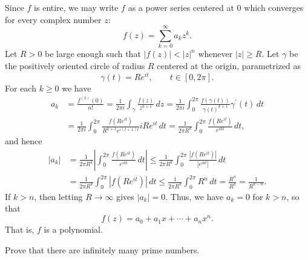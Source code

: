 \documentclass{homework}
\begin{document}
\begin{solution}
Since $f$ is entire, we may write $f$ as a power series centered at $0$ which
converges for every complex number $z$:
\begin{equation*}
f(z) = \sum_{k=0}^\infty a_k z^k.
\end{equation*}
Let $R > 0$ be large enough such that $|f(z)| < |z|^n$ whenever $|z| \geq R$.
Let $\gamma$ be the positively oriented circle of radius $R$ centered at the
origin, parametrized as
\begin{equation*}
\gamma(t) = R e^{i t},
\qquad
t \in [0,2\pi].
\end{equation*}
For each $k \geq 0$ we have
\begin{align*}
a_k
&= \frac{f^{(k)}(0)}{n!}
= \frac{1}{2 \pi i} \int_\gamma \frac{f(z)}{z^{k+1}} \, dz
= \frac{1}{2 \pi i} \int_0^{2\pi} \frac{f(\gamma(t))}{\gamma(t)^{k+1}} \gamma^\prime(t) \, dt
\\&= \frac{1}{2 \pi i} \int_0^{2\pi} \frac{f(R e^{i t})}{R^{k+1} e^{i(t+1) t}} i R e^{i t} \, dt
= \frac{1}{2 \pi R^k} \int_0^{2\pi} \frac{f(R e^{i t})}{e^{i k t}} \, dt,
\end{align*}
and hence
\begin{align*}
|a_k|
&= \frac{1}{2 \pi R^k} \left|\int_0^{2\pi} \frac{f(R e^{i t})}{e^{i k t}} \, dt\right|
\leq \frac{1}{2 \pi R^k} \int_0^{2\pi} \frac{|f(R e^{i t})|}{|e^{i k t}|} \, dt
\\&= \frac{1}{2 \pi R^k} \int_0^{2\pi} |f(R e^{i t})| \, dt
\leq \frac{1}{2 \pi R^k} \int_0^{2\pi} R^n \, dt
= \frac{R^n}{R^k}
= \frac{1}{R^{k - n}}.
\end{align*}
If $k > n$, then letting $R \to \infty$ gives $|a_k| = 0$.
Thus, we have $a_k = 0$ for $k > n$, so that
\begin{equation*}
f(z) = a_0 + a_1 x + \cdots + a_n x^n.
\end{equation*}
That is, $f$ is a polynomial.
\end{solution}

\begin{problem}
Prove that there are infinitely many prime numbers.
\end{problem}
\end{document}
